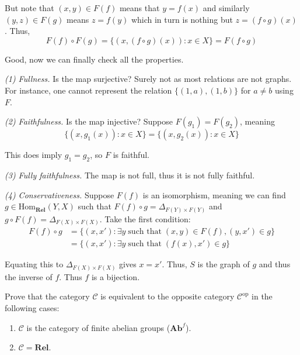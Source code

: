 \documentclass{category-template}
\begin{document}
But note that $(x,y) \in F(f)$ means that $y=f(x)$ and similarly $(y,z) \in
F(g)$ means $z=f(y)$ which in turn is nothing but $z=(f \circ g)(x)$. Thus,
\begin{equation*}
    F(f) \circ F(g) = \{(x,(f \circ g)(x)): x \in X\} = F(f \circ g)
\end{equation*}

Good, now we can finally check all the properties.

\textit{(1) Fullness.} Is the map surjective? Surely not as most relations are
not graphs. For instance, one cannot represent the relation $\{(1,a),(1,b)\}$
for $a \neq b$ using $F$. 

\textit{(2) Faithfulness.} Is the map injective? Suppose $F(g_1) = F(g_2)$, 
meaning
\begin{equation*}
    \{(x,g_1(x)): x \in X\} = \{(x,g_2(x)): x \in X\}
\end{equation*}

This does imply $g_1 = g_2$, so $F$ is faithful.

\textit{(3) Fully faithfulness.} The map is not full, thus it is not fully
faithful.

\textit{(4) Conservativeness.} Suppose $F(f)$ is an isomorphism, meaning we can
find $g \in \text{Hom}_{\textbf{Rel}}(Y,X)$ such that $F(f) \circ g =
\Delta_{F(Y) \times F(Y)}$ and $g \circ F(f) = \Delta_{F(X) \times F(X)}$. Take 
the first condition:
\begin{align*}
    F(f) \circ g &= \{(x,x'): \exists y \; \text{such that} \; (x,y) \in F(f), (y,x') \in g\} \\
    &= \{(x,x'): \exists y \; \text{such that} \; (f(x),x') \in g\}
\end{align*}

Equating this to $\Delta_{F(X) \times F(X)}$ gives $x=x'$. Thus, $S$ is the
graph of $g$ and thus the inverse of $f$. Thus $f$ is a bijection.

\begin{problem}
    Prove that the category $\mathcal{C}$ is equivalent to the opposite category
    $\mathcal{C}^{\text{op}}$ in the following cases:
    \begin{enumerate}
        \item $\mathcal{C}$ is the category of finite abelian groups
        ($\textbf{Ab}^f$).
        \item $\mathcal{C} = \textbf{Rel}$.
    \end{enumerate}
\end{problem}
\end{document}
